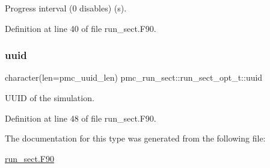 Progress interval (0 disables) (s). 



Definition at line 40 of file run\+\_\+sect.\+F90.

\mbox{\label{structpmc__run__sect_1_1run__sect__opt__t_a270100565f29bae422e6bd3e4c37a6a0}} 
\subsubsection{\texorpdfstring{uuid}{uuid}}
{\footnotesize\ttfamily character(len=pmc\+\_\+uuid\+\_\+len) pmc\+\_\+run\+\_\+sect\+::run\+\_\+sect\+\_\+opt\+\_\+t\+::uuid}



U\+U\+ID of the simulation. 



Definition at line 48 of file run\+\_\+sect.\+F90.



The documentation for this type was generated from the following file\+:\begin{DoxyCompactItemize}
\item 
\mbox{\hyperlink{run__sect_8_f90}{run\+\_\+sect.\+F90}}\end{DoxyCompactItemize}

